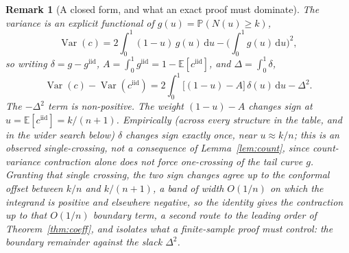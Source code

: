 \documentclass[11pt]{article}
\newtheorem{remark}{Remark}
\begin{document}
\begin{remark}[A closed form, and what an exact proof must dominate]
The variance is an explicit functional of $g(u)=\mathbb P(N(u)\ge k)$,
\begin{equation}
\operatorname{Var}(c)=2\int_0^1(1-u)\,g(u)\,\mathrm du-\Big(\int_0^1 g(u)\,\mathrm du\Big)^{\!2},
\end{equation}
so writing $\delta=g-g^{\mathrm{iid}}$, $A=\int_0^1 g^{\mathrm{iid}}=1-\mathbb E[c^{\mathrm{iid}}]$,
and $\Delta=\int_0^1\delta$,
\begin{equation}
\operatorname{Var}(c)-\operatorname{Var}(c^{\mathrm{iid}})
=2\int_0^1\big[(1-u)-A\big]\,\delta(u)\,\mathrm du-\Delta^2 .
\end{equation}
The $-\Delta^2$ term is non-positive. The weight $(1-u)-A$ changes sign at
$u=\mathbb E[c^{\mathrm{iid}}]=k/(n+1)$. Empirically (across every structure in the table, and in the
wider search below) $\delta$ changes sign exactly once, near $u\approx k/n$; this is an
\emph{observed} single-crossing, not a consequence of Lemma~\ref{lem:count}, since count-variance
contraction alone does not force one-crossing of the tail curve $g$. \emph{Granting} that single
crossing, the two sign changes agree up to the conformal offset between $k/n$ and $k/(n+1)$, a band of
width $O(1/n)$ on which the integrand is positive and elsewhere negative, so the identity gives the
contraction up to that $O(1/n)$ boundary term, a second route to the leading order of
Theorem~\ref{thm:coeff}, and isolates what a finite-sample proof must control: the boundary remainder
against the slack $\Delta^2$.
\end{remark}
\end{document}
